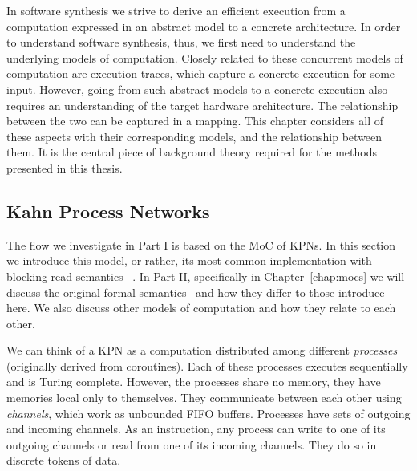 In software synthesis we strive to derive an efficient execution from a computation expressed in an abstract model to a concrete architecture.
In order to understand software synthesis, thus, we first need to understand the underlying models of computation.
Closely related to these concurrent models of computation are execution traces, which capture a concrete execution for some input.
However, going from such abstract models to a concrete execution also requires an understanding of the target hardware architecture.
The relationship between the two can be captured in a mapping.
This chapter considers all of these aspects with their corresponding models, and the relationship between them.
It is the central piece of background theory required for the methods presented in this thesis.

\subsection{Kahn Process Networks}

The flow we investigate in Part I is based on the \ac{MoC} of \acfp{KPN}.
In this section we introduce this model, or rather, its most common implementation with blocking-read semantics~\cite{kahn_macqueen} .
In Part II, specifically in Chapter~\ref{chap:mocs} we will discuss the original formal semantics~\cite{kahn74} and how they differ to those introduce here.
We also discuss other models of computation and how they relate to each other.

We can think of a \ac{KPN} as a computation distributed among different \emph{processes} (originally derived from coroutines).
Each of these processes executes sequentially and is Turing complete. However, the processes share no memory, they have memories local only to themselves.
They communicate between each other using \emph{channels}, which work as unbounded \acs{FIFO} buffers. 
Processes have sets of outgoing and incoming channels.
As an instruction, any process can write to one of its outgoing channels or read from one of its incoming channels.
They do so in discrete tokens of data.

